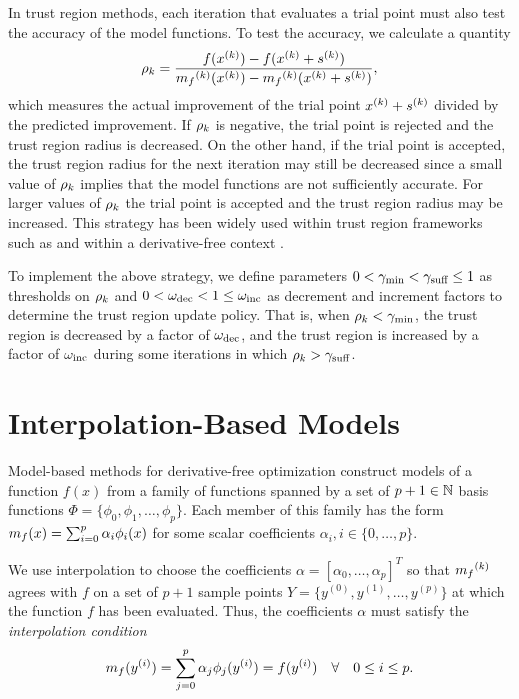 In trust region methods, each iteration that evaluates a trial point must also test the accuracy of the model functions.
To test the accuracy, we calculate a quantity
\begin{align}
\label{define_rhok}
\rho_k = \frac{f(x^{(k)}) - f(x^{(k)}+{{s}^{(k)}})}{{{m}_f}^{(k)}(x^{(k)}) - {{m}_f}^{(k)}(x^{(k)}+{{s}^{(k)}})},
\end{align}
which measures the actual improvement of the trial point $x^{(k)}+{{s}^{(k)}}$ divided by the predicted improvement.  If $\rho_k$ is negative, the trial point is rejected and the trust region radius is decreased.   On the other hand, if the trial point is accepted, the trust region radius for the next iteration may still be decreased since 
a small value of $\rho_k$ implies that the model functions are not sufficiently accurate.   For larger values of $\rho_k$ the trial point is accepted and the trust region radius may be increased.
This strategy has been widely used within trust region frameworks such as \cite{Conn:2000:TM:357813} and within a derivative-free context \cite{introduction_book}.

To implement the above strategy,  we define parameters
$
0 < \gamma_{\textrm{min}} < \gamma_{\textrm{suff}} \le 1
$
as thresholds on $\rho_k$ and
$
0 < \omega_{\text{dec}} < 1 \le \omega_{\text{inc}}
$
as decrement and increment factors to determine the trust region update policy.
That is, when $\rho_k < \gamma_{\textrm{min}}$, the trust region is decreased by a factor of $\omega_{\text{dec}}$, and the trust region is increased by a factor of $\omega_{\text{inc}}$
during some iterations in which $\rho_k > \gamma_{\textrm{suff}}$.


\section{Interpolation-Based Models}

\label{interpolation}

Model-based methods for derivative-free optimization construct models of a function $f(x)$ from a family of functions spanned by a set of $p + 1 \in \mathbb N$ basis functions  $\Phi = \{\phi_0, \phi_1, \ldots, \phi_p\}$. Each member of this family has the form ${{m}_f}(x) = \sum_{i=0}^p\alpha_i\phi_i(x)$ for some scalar coefficients $\alpha_i, i \in \{0, \ldots, p\}$.

We use interpolation to choose the coefficients $\alpha = [\alpha_0, \ldots, \alpha_p]^T$ so that ${{m}_f}^{(k)}$ agrees with $f$ on a set of $p+1$ sample points $Y = \{y^{(0)}, y^{(1)}, \ldots, y^{(p)}\}$ at which the function $f$ has been evaluated.
Thus, the coefficients $\alpha$ must satisfy the \emph{interpolation condition}
\begin{align}
\label{interpolation_condition}
{{m}_f}(y^{(i)}) = \sum^p_{j=0}\alpha_j\phi_j(y^{(i)}) = f(y^{(i)}) \quad \forall \quad 0 \le i \le p.
\end{align}


